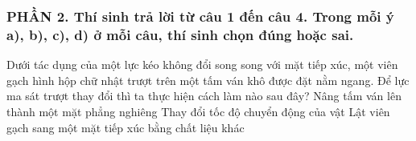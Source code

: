\subsubsection*{PHẦN 2. Thí sinh trả lời từ câu 1 đến câu 4. Trong mỗi ý a), b), c), d) ở mỗi câu, thí sinh chọn đúng hoặc sai.}
\setcounter{ex}{0}
\begin{ex}%
Dưới tác dụng của một lực kéo không đổi song song với mặt tiếp xúc, một viên gạch hình hộp chữ nhật trượt trên một tấm ván khô được đặt nằm ngang. Để lực ma sát trượt thay đổi thì ta thực hiện cách làm nào sau đây?
{\True Nâng tấm ván lên thành một mặt phẳng nghiêng}	
{Thay đổi tốc độ chuyển động của vật}
{\True Lật viên gạch sang một mặt tiếp xúc bằng chất liệu khác}	
\loigiai{
\begin{itemchoice}
\itemch
\itemch
\itemch
\itemch	
\end{itemchoice}
}
\end{ex}

